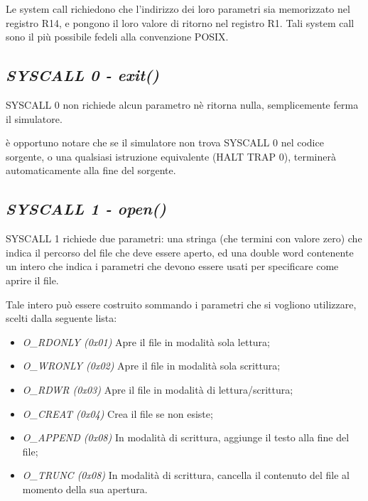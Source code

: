 \documentclass[letterpaper,10pt,italian]{sphinxmanual}
\begin{document}
Le system call richiedono che l'indirizzo dei loro parametri sia memorizzato
nel registro R14, e pongono il loro valore di ritorno nel registro R1.  Tali
system call sono il più possibile fedeli alla convenzione POSIX.


\subsection{\emph{SYSCALL 0 - exit()}}
\label{instructions:syscall-0-exit}
SYSCALL 0 non richiede alcun parametro nè ritorna nulla, semplicemente ferma
il simulatore.

è opportuno notare che se il simulatore non trova SYSCALL 0 nel codice
sorgente, o una qualsiasi istruzione equivalente (HALT  TRAP 0), terminerà
automaticamente alla fine del sorgente.


\subsection{\emph{SYSCALL 1 - open()}}
\label{instructions:syscall-1-open}
SYSCALL 1 richiede due parametri: una stringa (che termini con valore zero) che
indica il percorso del file che deve essere aperto, ed una double word
contenente un intero che indica i parametri che devono essere usati per
specificare come aprire il file.

Tale intero può essere costruito sommando i parametri che si vogliono
utilizzare, scelti dalla seguente lista:
\begin{itemize}
\item {} 
\emph{O\_RDONLY (0x01)} Apre il file in modalità sola lettura;

\item {} 
\emph{O\_WRONLY (0x02)} Apre il file in modalità sola scrittura;

\item {} 
\emph{O\_RDWR (0x03)} Apre il file in modalità di lettura/scrittura;

\item {} 
\emph{O\_CREAT (0x04)} Crea il file se non esiste;

\item {} 
\emph{O\_APPEND (0x08)} In modalità di scrittura, aggiunge il testo alla fine del file;

\item {} 
\emph{O\_TRUNC (0x08)} In modalità di scrittura, cancella il contenuto del file al momento della sua apertura.

\end{itemize}
\end{document}
